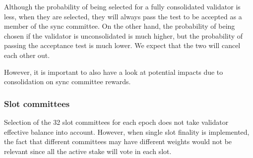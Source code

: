 Although the probability of being selected for a fully consolidated validator is less, when they are selected, they will always pass the test to be accepted as a member of the sync committee. On the other hand, the probability of being chosen if the validator is unconsolidated is much higher, but the probability of passing the acceptance test is much lower. We expect that the two will cancel each other out.

However, it is important to also have a look at potential impacts due to consolidation on sync committee rewards.

\begin{table}[htp]
\caption{Expected Sync committee membership for example scenario }
\label{tbl:syncexp}
\end{table}%


\subsubsection*{Slot committees}
Selection of the 32 slot committees for each epoch does not take validator effective balance into account. However, when single slot finality is implemented, the fact that different committees may have different weights would not be relevant since all the active stake will vote in each slot.

